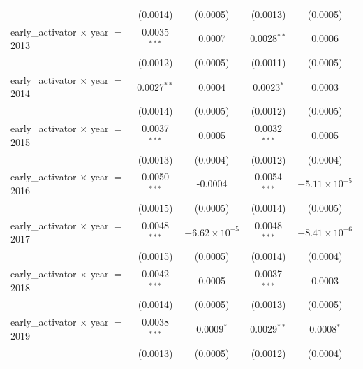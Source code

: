 \begin{tabular}{lcccc}
                                             & (0.0014)           & (0.0005)                  & (0.0013)             & (0.0005)\\   
   early\_activator $\times$ year $=$ 2013   & 0.0035$^{***}$     & 0.0007                    & 0.0028$^{**}$        & 0.0006\\   
                                             & (0.0012)           & (0.0005)                  & (0.0011)             & (0.0005)\\   
   early\_activator $\times$ year $=$ 2014   & 0.0027$^{**}$      & 0.0004                    & 0.0023$^{*}$         & 0.0003\\   
                                             & (0.0014)           & (0.0005)                  & (0.0012)             & (0.0005)\\   
   early\_activator $\times$ year $=$ 2015   & 0.0037$^{***}$     & 0.0005                    & 0.0032$^{***}$       & 0.0005\\   
                                             & (0.0013)           & (0.0004)                  & (0.0012)             & (0.0004)\\   
   early\_activator $\times$ year $=$ 2016   & 0.0050$^{***}$     & -0.0004                   & 0.0054$^{***}$       & $-5.11\times 10^{-5}$\\    
                                             & (0.0015)           & (0.0005)                  & (0.0014)             & (0.0005)\\   
   early\_activator $\times$ year $=$ 2017   & 0.0048$^{***}$     & $-6.62\times 10^{-5}$     & 0.0048$^{***}$       & $-8.41\times 10^{-6}$\\    
                                             & (0.0015)           & (0.0005)                  & (0.0014)             & (0.0004)\\   
   early\_activator $\times$ year $=$ 2018   & 0.0042$^{***}$     & 0.0005                    & 0.0037$^{***}$       & 0.0003\\   
                                             & (0.0014)           & (0.0005)                  & (0.0013)             & (0.0005)\\   
   early\_activator $\times$ year $=$ 2019   & 0.0038$^{***}$     & 0.0009$^{*}$              & 0.0029$^{**}$        & 0.0008$^{*}$\\   
                                             & (0.0013)           & (0.0005)                  & (0.0012)             & (0.0004)\\   

\end{tabular}
